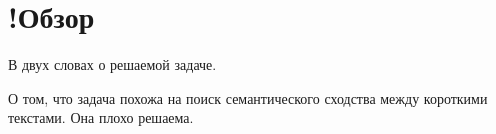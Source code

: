 \section{!Обзор}
    В двух словах о решаемой задаче.

    О том, что задача похожа на поиск семантического сходства между короткими текстами. Она плохо решаема.

    
    
    
    




